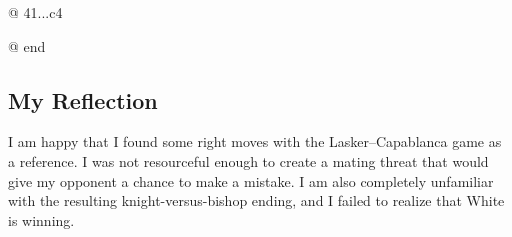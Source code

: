@ 41...c4

@ end
\subsection*{My Reflection}

I am happy that I found some right moves with the Lasker--Capablanca game as a reference.
I was not resourceful enough to create a mating threat that would give my opponent a chance to make
a mistake. I am also completely unfamiliar with the resulting knight-versus-bishop ending, and I failed
to realize that White is winning.
